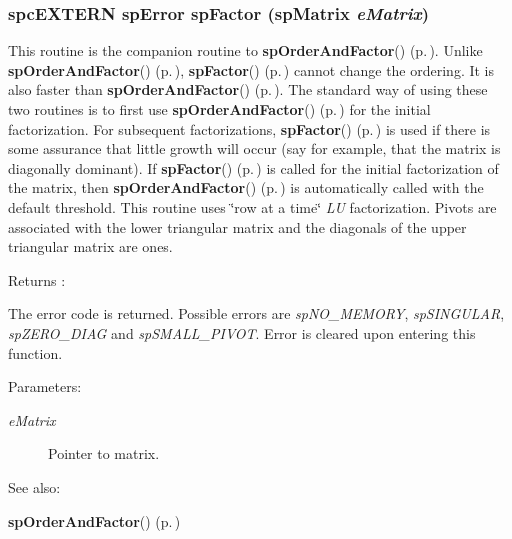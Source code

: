 \subsubsection{\setlength{\rightskip}{0pt plus 5cm}spc\-EXTERN {\bf sp\-Error} sp\-Factor ({\bf sp\-Matrix} {\em e\-Matrix})}\label{spMatrix_8h_a30}


This routine is the companion routine to {\bf sp\-Order\-And\-Factor}() {\rm (p.\,\pageref{spMatrix_8h_a46})}. Unlike {\bf sp\-Order\-And\-Factor}() {\rm (p.\,\pageref{spMatrix_8h_a46})}, {\bf sp\-Factor}() {\rm (p.\,\pageref{spMatrix_8h_a30})} cannot change the ordering. It is also faster than {\bf sp\-Order\-And\-Factor}() {\rm (p.\,\pageref{spMatrix_8h_a46})}. The standard way of using these two routines is to first use {\bf sp\-Order\-And\-Factor}() {\rm (p.\,\pageref{spMatrix_8h_a46})} for the initial factorization. For subsequent factorizations, {\bf sp\-Factor}() {\rm (p.\,\pageref{spMatrix_8h_a30})} is used if there is some assurance that little growth will occur (say for example, that the matrix is diagonally dominant). If {\bf sp\-Factor}() {\rm (p.\,\pageref{spMatrix_8h_a30})} is called for the initial factorization of the matrix, then {\bf sp\-Order\-And\-Factor}() {\rm (p.\,\pageref{spMatrix_8h_a46})} is automatically called with the default threshold. This routine uses \char`\"{}row at a time\char`\"{} {\em LU} factorization. Pivots are associated with the lower triangular matrix and the diagonals of the upper triangular matrix are ones.

\begin{Desc}
\item[Returns :]\par
 The error code is returned. Possible errors are {\em sp\-NO\_\-MEMORY}, {\em sp\-SINGULAR}, {\em sp\-ZERO\_\-DIAG} and {\em sp\-SMALL\_\-PIVOT}. Error is cleared upon entering this function.\end{Desc}
\begin{Desc}
\item[Parameters: ]\par
\begin{description}
\item[{\em 
e\-Matrix}]Pointer to matrix. \end{description}
\end{Desc}
\begin{Desc}
\item[See also: ]\par
{\bf sp\-Order\-And\-Factor}() {\rm (p.\,\pageref{spMatrix_8h_a46})} \end{Desc}
